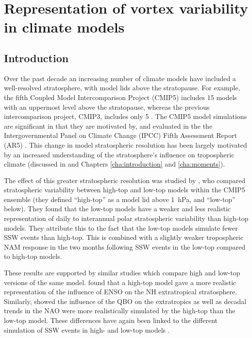 \chapter{Representation of vortex variability in climate models}
\label{cha:models}


\section{Introduction}


Over the past decade an increasing number of climate models have included a
well-resolved stratosphere, with model lids above the stratopause. For example,
the fifth Coupled Model Intercomparison Project (CMIP5) \citep{Taylor2012}
includes 15 models with an uppermost level above the stratopause, whereas the
previous intercomparison project, CMIP3, includes only 5
\citep{Cordero2006}. The CMIP5 model simulations are significant in that they
are motivated by, and evaluated in the the Intergovernmental Panel on Climate
Change (IPCC) Fifth Assessment Report (AR5) \citep{Stocker2013}. This change in
model stratospheric resolution has been largely motivated by an increased
understanding of the stratosphere's influence on tropospheric climate (discussed
in \citet{Gerber2012} and Chapters \ref{cha:introduction} and
\ref{cha:moments}).

The effect of this greater stratospheric resolution was studied by
\citet{Charlton-Perez2013}, who compared stratospheric variability between
high-top and low-top models within the CMIP5 ensemble (they defined ``high-top''
as a model lid above 1~hPa, and ``low-top'' below). They found that the low-top
models have a weaker and less realistic representation of daily to interannual
polar stratospheric variability than high-top models. They attribute this to the
fact that the low-top models simulate fewer SSW events than high-top. This is
combined with a slightly weaker tropospheric NAM response in the two months
following SSW events in the low-top compared to high-top models.

These results are supported by similar studies which compare high and low-top
versions of the same model. \citet{Cagnazzo2009} found that a high-top model
gave a more realistic representation of the influence of ENSO on the NH
extratropical stratosphere. Similarly, \citet{Hardiman2012a} showed the
influence of the QBO on the extratropics as well as decadal trends in the NAO
were more realistically simulated by the high-top than the low-top model. These
differences have again been linked to the different simulation of SSW events in
high- and low-top models \citep{Sassi2010}. 

